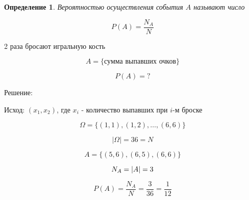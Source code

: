 \documentclass[a4paper, 14pt]{report}
\newtheorem{defenition}{Определение}[chapter]
\begin{document}
    \begin{defenition}
        Вероятностью осуществления события $A$ называют число

        $$
        P(A) = \frac{N_A}{N}
        $$
    \end{defenition}

    2 раза бросают игральную кость

    $$
    A = \{ \text{сумма выпавших очков} \}
    $$

    $$
    P(A) = ?
    $$

    Решение:

    Исход: $(x_1, x_2)$, где $x_i$ - количество выпавших при $i$-м броске

    $$
    \Omega = \{ (1,1), (1,2), \dots, (6,6) \}
    $$

    $$
    |\Omega| = 36 = N
    $$
    
    $$
    A = \{ (5,6), (6,5), (6,6) \}
    $$

    $$
    N_A = |A| = 3 \\
    $$

    $$
    P(A) = \frac{N_A}{N} = \frac{3}{36} = \frac{1}{12}
    $$
\end{document}

